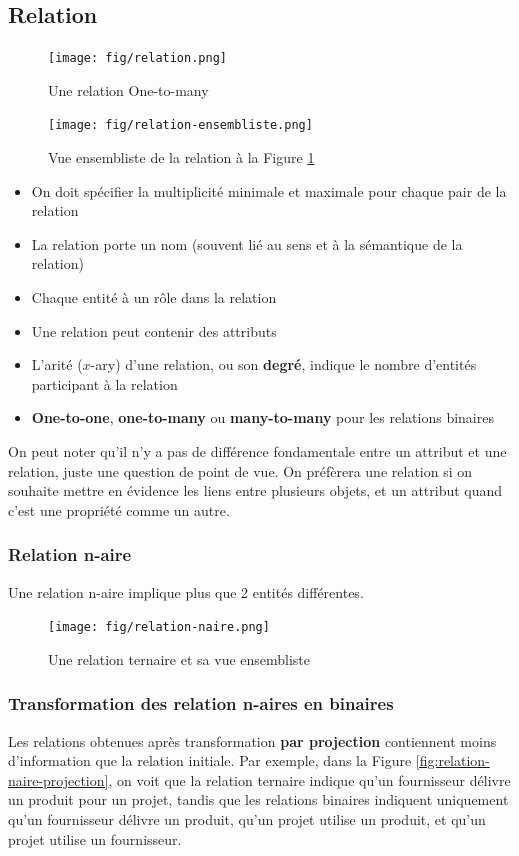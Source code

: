 \documentclass[a4paper]{article}
\begin{document}
\subsection{Relation}
\begin{figure}[H]
    \center
    \texttt{[image: fig/relation.png]}
    \caption{\label{fig:relation}Une relation One-to-many}
\end{figure}
\begin{figure}[H]
    \center
    \texttt{[image: fig/relation-ensembliste.png]}
    \caption{Vue ensembliste de la relation à la Figure \ref{fig:relation}}
\end{figure}
\begin{itemize}
  \item On doit spécifier la multiplicité minimale et maximale pour chaque pair de la relation
  \item La relation porte un nom (souvent lié au sens et à la sémantique de la relation)
  \item Chaque entité à un rôle dans la relation
  \item Une relation peut contenir des attributs
  \item L'arité ($x$-ary) d'une relation, ou son \textbf{degré}, indique le nombre d'entités participant à la relation
  \item \textbf{One-to-one}, \textbf{one-to-many} ou \textbf{many-to-many} pour les relations binaires
\end{itemize}

On peut noter qu'il n'y a pas de différence fondamentale entre un attribut et une relation,
juste une question de point de vue. On préfèrera une relation si on souhaite mettre en évidence
les liens entre plusieurs objets, et un attribut quand c'est une propriété comme un autre.

\subsubsection{Relation n-aire}
Une relation n-aire implique plus que 2 entités différentes.

\begin{figure}[H]
    \center
    \texttt{[image: fig/relation-naire.png]}
    \caption{Une relation ternaire et sa vue ensembliste}
\end{figure}

\subsubsection{Transformation des relation n-aires en binaires}
Les relations obtenues après transformation \textbf{par projection} contiennent moins d'information
que la relation initiale. Par exemple, dans la Figure \ref{fig:relation-naire-projection},
on voit que la relation ternaire indique qu'un fournisseur délivre un produit pour un projet,
tandis que les relations binaires indiquent uniquement qu'un fournisseur délivre un produit,
qu'un projet utilise un produit, et qu'un projet utilise un fournisseur.
\end{document}
